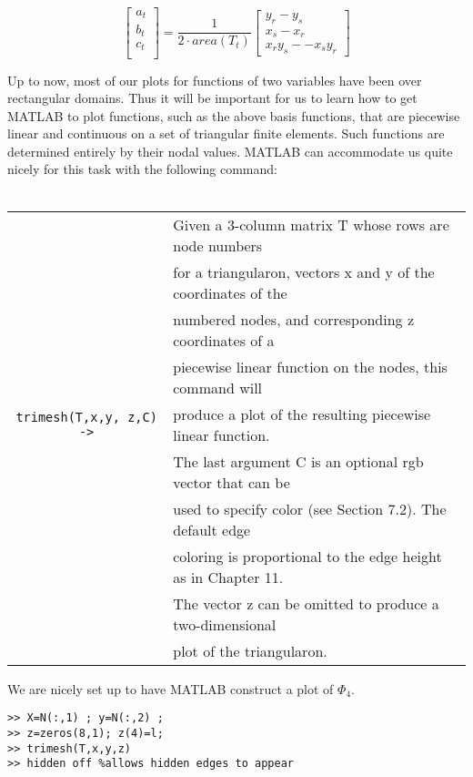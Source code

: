 \documentclass[../main.tex]{subfiles}
\begin{document}
$$
	\begin{bmatrix} 
		  a_t\\
		  b_t\\
		  c_t\\	 
	\end{bmatrix}
	=\dfrac{1}{2 \cdot area (T_t)}
	\begin{bmatrix} 
		  y_r-y_s\\
		  x_s-x_r\\
		  x_r y_s - -x_s y_r	 
	\end{bmatrix}
$$

Up to now, most of our plots for functions of two variables have been over rectangular domains. Thus it will be important for us to learn how to get MATLAB to plot functions, such as the above basis functions, that are piecewise linear and continuous on a set of triangular finite elements. Such functions are determined entirely by their nodal values. MATLAB can accommodate us quite nicely for this task with the following command: 
\\
\\
\begin{center}
\begin{tabular}{|c|l|}
\hline
 
&Given a 3-column matrix T whose rows are node numbers\\ 
&for a triangularon, vectors x and y of the coordinates of the \\
&numbered nodes, and corresponding z coordinates of a \\
&piecewise linear function on the nodes, this command will \\
  \texttt{trimesh(T,x,y, z,C) ->}&produce a plot of the resulting piecewise linear function.\\ 
&The last argument C is an optional rgb vector that can be \\
&used to specify color (see Section 7.2). The default edge \\
&coloring is proportional to the edge height as in Chapter 11. \\
&The vector z can be omitted to produce a two-dimensional \\
&plot of the triangularon.\\
\hline
\end{tabular}
\end{center}
We are nicely set up to have MATLAB construct a plot of $\Phi_4$.

\begin{lstlisting}[numbers=none,frame=none]
>> X=N(:,1) ; y=N(:,2) ; 
>> z=zeros(8,1); z(4)=l; 
>> trimesh(T,x,y,z) 
>> hidden off %allows hidden edges to appear
\end{lstlisting}
\end{document}
